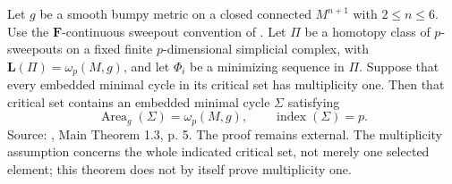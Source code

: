 \begin{theorem}\label{thm:minmax-index-equality}
Let $g$ be a smooth bumpy metric on a closed connected $M^{n+1}$ with $2\leq n\leq6$. Use the $\mathbf F$-continuous sweepout convention of \cite{MNIndex}. Let $\Pi$ be a homotopy class of $p$-sweepouts on a fixed finite $p$-dimensional simplicial complex, with $\mathbf L(\Pi)=\omega_p(M,g)$, and let $\Phi_i$ be a minimizing sequence in $\Pi$. Suppose that every embedded minimal cycle in its critical set has multiplicity one. Then that critical set contains an embedded minimal cycle $\Sigma$ satisfying
\[
 \operatorname{Area}_g(\Sigma)=\omega_p(M,g),\qquad
 \operatorname{index}(\Sigma)=p.
\]
Source: \cite{MNIndex}, Main Theorem 1.3, p. 5. The proof remains external. The multiplicity assumption concerns the whole indicated critical set, not merely one selected element; this theorem does not by itself prove multiplicity one.
\end{theorem}
